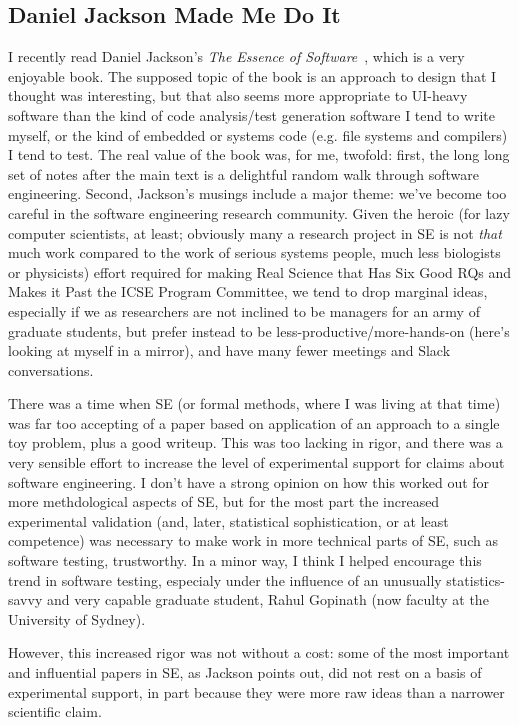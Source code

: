 \documentclass[sigplan,screen]{acmart}
\begin{document}
\subsection{Daniel Jackson Made Me Do It}

I recently read Daniel Jackson's \emph{The Essence of Software}~\cite{essence}, which
is a very enjoyable book.  The supposed topic of the book is an
approach to design that I thought was interesting, but that also seems
more appropriate to UI-heavy software than the
kind of code analysis/test generation software I tend to write
myself, or the kind of embedded or systems code (e.g. file systems and
compilers) I
tend to test.  The real value of the book was, for me, twofold:  first, the
long long set of notes after the main text is a delightful random
walk through software engineering.  Second, Jackson's musings include
a major theme:  we've become too careful in the software engineering
research community.  Given the heroic (for lazy computer scientists,
at least;
obviously many a research project in SE is not \emph{that} much work compared to
the work of serious systems people, much less biologists or
physicists) effort required for making Real Science that Has Six Good
RQs and Makes it Past the ICSE Program Committee, we tend to drop
marginal ideas, especially if we as researchers are not inclined to be
managers for an army of graduate students, but prefer instead to be
less-productive/more-hands-on (here's looking at myself in a mirror),
and have many fewer meetings and Slack conversations.

There was a time
when SE (or formal methods, where I was living at that time) was far
too accepting of a paper based on application of an approach to a
single toy problem, plus a good writeup.  This was too lacking in
rigor, and there was a very sensible effort to increase the level of
experimental support for claims about software engineering.  I don't
have a strong opinion on how this worked out for more methdological
aspects of SE, but for the most part the increased experimental
validation (and, later, statistical sophistication, or at least competence) was necessary to
make work in more technical parts of SE, such as software testing,
trustworthy.  In a minor way, I think I helped encourage this trend in
software testing, especialy under the influence of an unusually
statistics-savvy and very capable graduate student, Rahul Gopinath
(now faculty at the University of Sydney).

However, this increased rigor was not without a cost:  some of the most important and
influential papers in SE, as Jackson points out, did not rest on a
basis of experimental support, in part because they were more raw
ideas than a narrower scientific claim.
\end{document}
